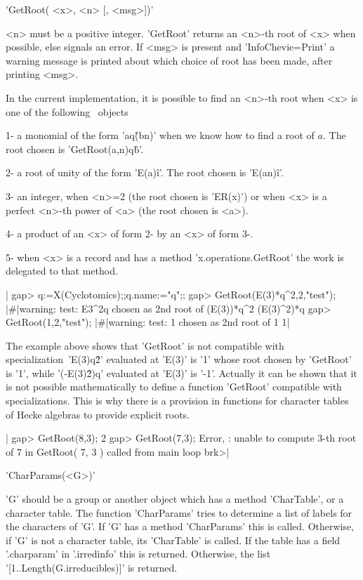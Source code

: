 'GetRoot( <x>, <n> [, <msg>])'

<n> must  be a  positive integer.  'GetRoot' returns  an <n>-th  root of
<x>  when possible,  else  signals an  error. If  <msg>  is present  and
'InfoChevie=Print' a  warning message is  printed about which  choice of
root has been made, after printing <msg>.

In the  current implementation, it  is possible  to find an  <n>-th root
when <x> is one of the following \GAP\ objects\:

1- a monomial of the form 'a\*q\^(b\*n)' when we know how to find a root
of $a$. The root chosen is 'GetRoot(a,n)\*q\^b'.

2-  a  root  of  unity  of  the  form  'E(a)\^i'.  The  root  chosen  is
'E(a\*n)\^i'.

3- an integer, when <n>=2 (the root  chosen is 'ER(x)') or when <x> is a
perfect <n>-th power of <a> (the root chosen is <a>).

4- a product of an <x> of form 2- by an <x> of form 3-.

5- when <x> is a record and has a method 'x.operations.GetRoot' the work
is delegated to that method.

|    gap> q:=X(Cyclotomics);;q.name:="q";;
    gap> GetRoot(E(3)*q^2,2,"test");
    |\#|warning: test: E3^2q chosen as 2nd root of (E(3))*q^2
    (E(3)^2)*q
    gap> GetRoot(1,2,"test");
    |\#|warning: test: 1 chosen as 2nd root of 1
    1|

The  example  above   shows  that  'GetRoot'  is   not  compatible  with
specialization\:\  'E(3)\*q\^2' evaluated  at 'E(3)'  is '1'  whose root
chosen by 'GetRoot' is '1', while '(-E(3)\^2)\*q' evaluated at 'E(3)' is
'-1'. Actually it can be shown that it is not possible mathematically to
define a function 'GetRoot' compatible with specializations. This is why
there is a provision in functions for character tables of Hecke algebras
to provide explicit roots.

|    gap> GetRoot(8,3);
    2
    gap> GetRoot(7,3);
    Error, : unable to compute 3-th root of 7
     in
    GetRoot( 7, 3 ) called from
    main loop
    brk>|

%
%

'CharParams(<G>)'

'G'  should   be  a  group  or   another  object  which  has   a  method
'CharTable', or  a character table.  The function 'CharParams'  tries to
determine a  list of  labels for  the characters  of 'G'.  If 'G'  has a
method  'CharParams'  this  is  called.  Otherwise,  if  'G'  is  not  a
character table,  its 'CharTable' is  called. If  the table has  a field
'.charparam'  in  '.irredinfo' this  is  returned.  Otherwise, the  list
'[1..Length(G.irreducibles)]' is returned.


